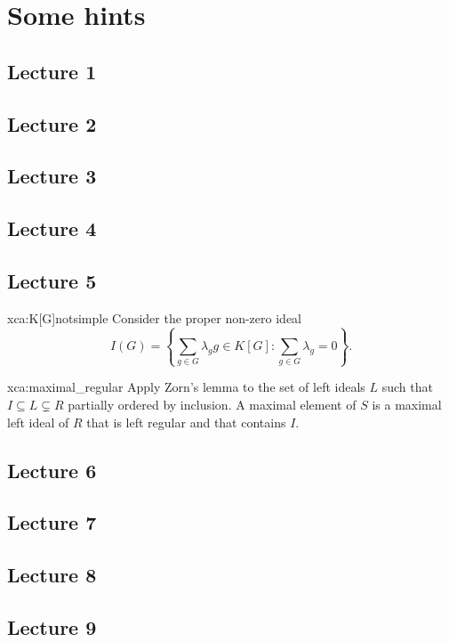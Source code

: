 \chapter[Some hints]{Some hints}

\section*{Lecture 1}
\section*{Lecture 2}
\section*{Lecture 3}
\section*{Lecture 4}
\section*{Lecture 5}

\begin{sol}{xca:K[G]notsimple}
Consider the proper non-zero ideal 
\[
	I(G)=\left\{\sum_{g\in G}\lambda_gg\in K[G]:\sum_{g\in G}\lambda_g=0\right\}.
\]
\end{sol}

\begin{sol}{xca:maximal_regular}
    Apply Zorn's lemma to the set of left ideals $L$ such that $I\subseteq L\subsetneq R$
    partially ordered by inclusion. A maximal element of $S$ is a maximal left ideal of $R$
    that is left regular and 
    that contains $I$. 
\end{sol}

\section*{Lecture 6}
\section*{Lecture 7}
\section*{Lecture 8}
\section*{Lecture 9}

